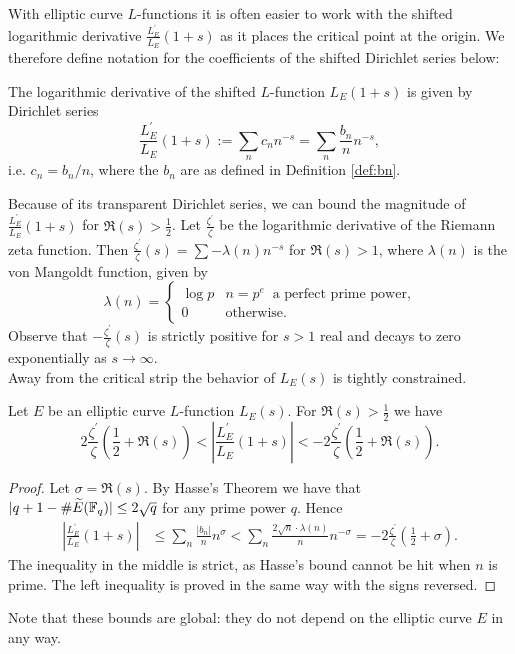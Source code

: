 \documentclass[10pt]{article}
\newcommand{\pr}{^{\prime}}
\newcommand{\Les}{L_E(s)}
\newcommand{\ldLe}[1]{\frac{L_E\pr}{L_E}\left(#1\right)}
\begin{document}
With elliptic curve $L$-functions it is often easier to work with the shifted logarithmic derivative $\ldLe{1+s}$ as it places the critical point at the origin. We therefore define notation for the coefficients of the shifted Dirichlet series below:
\begin{definition}\label{def:cn}
The logarithmic derivative of the shifted $L$-function $L_E(1+s)$ is given by Dirichlet series
\begin{equation}
\ldLe{1+s} := \sum_n c_n n^{-s} = \sum_{n} \frac{b_n}{n} n^{-s},
\end{equation}
i.e. $c_n = b_n/n$, where the $b_n$ are as defined in Definition \ref{def:bn}.
\end{definition}

Because of its transparent Dirichlet series, we can bound the magnitude of $\ldLe{1+s}$ for $\Re(s)>\frac{1}{2}$. Let $\frac{\zeta\pr}{\zeta}$ be the logarithmic derivative of the Riemann zeta function. Then $\frac{\zeta\pr}{\zeta}(s) = \sum -\lambda(n) n^{-s}$ for $\Re(s)>1$, where $\lambda(n)$ is the von Mangoldt function, given by
\begin{equation}\label{eqn:vonmangoldt}
\lambda(n) = \begin{cases} \log p & n = p^e \;\;\text{a perfect prime power,} \\ 0 & \text{otherwise.} \end{cases}
\end{equation}
Observe that $-\frac{\zeta\pr}{\zeta}(s)$ is strictly positive for $s > 1$ real and decays to zero exponentially as $s \to \infty$. \\

Away from the critical strip the behavior of $\Les$ is tightly constrained.
\begin{lemma}\label{lem:ldLe_bound}
Let $E$ be an elliptic curve $L$-function $L_E(s)$. For $\Re(s)>\frac{1}{2}$ we have\begin{equation}
2\frac{\zeta\pr}{\zeta}\left(\frac{1}{2}+\Re(s)\right) < \left| \ldLe{1+s}\right| < -2\frac{\zeta\pr}{\zeta}\left(\frac{1}{2}+\Re(s)\right).
\end{equation}
\end{lemma}

\begin{proof}
Let $\sigma = \Re(s)$. By Hasse's Theorem we have that $|q + 1 - \#\widetilde{E}(\mathbb{F}_{q})| \le 2\sqrt{q}$ for any prime power $q$. Hence
\begin{align*}
\left| \ldLe{1+s}\right| &\le \sum_n \frac{|b_n|}{n} n^\sigma < \sum_{n} \frac{2\sqrt{n} \cdot \lambda(n)}{n} n^{-\sigma}  = -2\frac{\zeta\pr}{\zeta}\left(\frac{1}{2}+\sigma\right).
\end{align*}
The inequality in the middle is strict, as Hasse's bound cannot be hit when $n$ is prime. The left inequality is proved in the same way with the signs reversed.
\end{proof}
Note that these bounds are global: they do not depend on the elliptic curve $E$ in any way.
\end{document}
